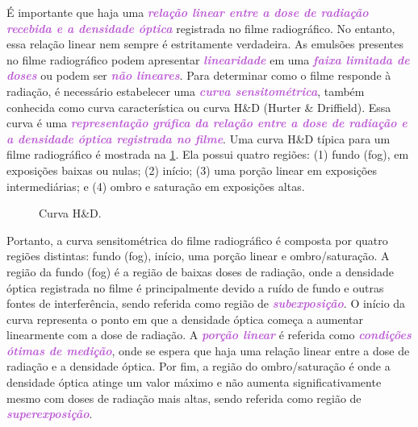 \documentclass[11pt,a4paper]{article}
\begin{document}
	É importante que haja uma \textcolor{MediumOrchid}{\textit{\textbf{relação linear entre a dose de radiação recebida e a densidade óptica}}} registrada no filme radiográfico. No entanto, essa relação linear nem sempre é estritamente verdadeira. As emulsões presentes no filme radiográfico podem apresentar \textcolor{MediumOrchid}{\textit{\textbf{linearidade}}} em uma \textcolor{MediumOrchid}{\textit{\textbf{faixa limitada de doses}}} ou podem ser \textcolor{MediumOrchid}{\textit{\textbf{não lineares}}}. Para determinar como o filme responde à radiação, é necessário estabelecer uma \textcolor{MediumOrchid}{\textit{\textbf{curva sensitométrica}}}, também conhecida como curva característica ou curva H\&D (Hurter \& Driffield). Essa curva é uma \textcolor{MediumOrchid}{\textit{\textbf{representação gráfica da relação entre a dose de radiação e a densidade óptica registrada no filme}}}. Uma curva H\&D típica para um filme radiográfico é mostrada na \ref{fig:curvaHD}. Ela possui quatro regiões: (1) fundo (fog), em exposições baixas ou nulas; (2) início; (3) uma porção linear em exposições intermediárias; e (4) ombro e saturação em exposições altas.

	\begin{figure}[h]
		\centering
		\caption{Curva H\&D.}
		\label{fig:curvaHD}
	\end{figure}

	Portanto, a curva sensitométrica do filme radiográfico é composta por quatro regiões distintas: fundo (fog), início, uma porção linear e ombro/saturação. A região da fundo (fog) é a região de baixas doses de radiação, onde a densidade óptica registrada no filme é principalmente devido a ruído de fundo e outras fontes de interferência, sendo referida como região de \textcolor{MediumOrchid}{\textit{\textbf{subexposição}}}. O início da curva representa o ponto em que a densidade óptica começa a aumentar linearmente com a dose de radiação. A \textcolor{MediumOrchid}{\textit{\textbf{porção linear}}} é referida como \textcolor{MediumOrchid}{\textit{\textbf{condições ótimas de medição}}}, onde se espera que haja uma relação linear entre a dose de radiação e a densidade óptica. Por fim, a região do ombro/saturação é onde a densidade óptica atinge um valor máximo e não aumenta significativamente mesmo com doses de radiação mais altas, sendo referida como região de \textcolor{MediumOrchid}{\textit{\textbf{superexposição}}}.
\end{document}
